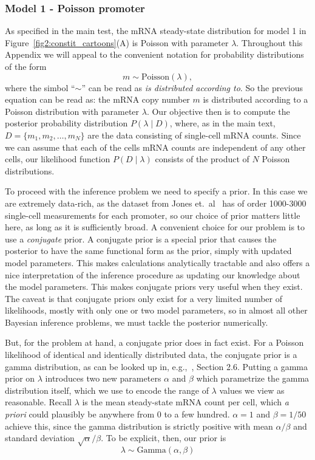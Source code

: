 \subsubsection{Model 1 - Poisson promoter}

As specified in the main test, the mRNA steady-state distribution for model 1 in
Figure~\ref{fig2:constit_cartoons}(A) is Poisson with parameter $\lambda$.
Throughout this Appendix we will appeal to the convenient notation for
probability distributions of the form
\begin{equation}
m \sim \text{Poisson}(\lambda),
\end{equation}
where the simbol ``$\sim$'' can be read as \textit{is distributed according to}.
So the previous equation can be read as: the mRNA copy number $m$ is distributed
according to a Poisson distribution with parameter $\lambda$. Our objective then
is to compute the posterior probability distribution $P(\lambda \mid D)$, where,
as in the main text, $D = \{ m_1, m_2, \ldots, m_N \}$ are the data consisting
of single-cell mRNA counts. Since we can assume that each of the cells mRNA
counts are independent of any other cells, our likelihood function $P(D \mid
\lambda)$ consists of the product of $N$ Poisson distributions.

To proceed with the inference problem we need to specify a prior. In this case
we are extremely data-rich, as the dataset from Jones et.\ al~\cite{Jones2014}
has of order 1000-3000 single-cell measurements for each promoter, so our choice
of prior matters little here, as long as it is sufficiently broad. A convenient
choice for our problem is to use a \textit{conjugate} prior. A conjugate prior
is a special prior that causes the posterior to have the same functional form as
the prior, simply with updated model parameters. This makes calculations
analytically tractable and also offers a nice interpretation of the inference
procedure as updating our knowledge about the model parameters. This makes
conjugate priors very useful when they exist. The caveat is that conjugate
priors only exist for a very limited number of likelihoods, mostly with only one
or two model parameters, so in almost all other Bayesian inference problems, we
must tackle the posterior numerically.

But, for the problem at hand, a conjugate prior does in fact exist. For a
Poisson likelihood of identical and identically distributed data, the conjugate
prior is a gamma distribution, as can be looked up in, e.g.,~\cite{Gelman2013},
Section 2.6. Putting a gamma prior on $\lambda$ introduces two new parameters
$\alpha$ and $\beta$ which parametrize the gamma distribution itself, which we
use to encode the range of $\lambda$ values we view as reasonable. Recall
$\lambda$ is the mean steady-state mRNA count per cell, which \textit{a priori}
could plausibly be anywhere from 0 to a few hundred. $\alpha=1$ and $\beta=1/50$
achieve this, since the gamma distribution is strictly positive with mean
$\alpha/\beta$ and standard deviation $\sqrt{\alpha}/\beta$. To be explicit,
then, our prior is
\begin{equation}
\lambda \sim \text{Gamma}(\alpha, \beta)
\end{equation}

